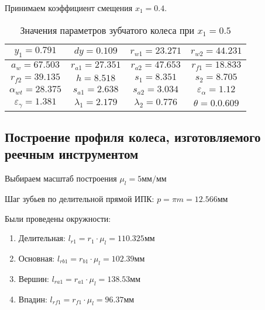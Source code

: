 Принимаем коэффициент смещения $x_1 = 0.4$.

\begin{table}[h]
	\caption{Значения параметров зубчатого колеса при $x_1 = 0.5$}
	\begin{tabular}{|c|c|c|c|}
		\hline 
		$y_1 = 0.791$ & $dy = 0.109$ &  $r_{w1} = 23.271$ & $r_{w2} = 44.231$ \\ 
		\hline 
		$a_w = 67.503$ & $r_{a1} = 27.351$ & $r_{a2} = 47.653$ & $r_{f1} = 18.833$ \\ 
		\hline 
		$r_{f2} = 39.135$ & $h = 8.518$ & $s_1 = 8.351$ & $s_2 = 8.705$ \\ 
		\hline 
		$\alpha_{wt} = 28.375$ & $s_{a1} = 2.638$ & $s_{a2} = 3.034$ & $\varepsilon_{\alpha} = 1.12$ \\ 
		\hline 
		$\varepsilon_{\gamma} = 1.381$ & $\lambda_1 = 2.179$ & $\lambda_2 = 0.776$ & $\theta = 0.0.609$ \\ 
		\hline 
	\end{tabular} 
	\label{final_table}
\end{table}

\subsection{Построение профиля колеса, изготовляемого реечным инструментом}

Выбираем масштаб построения $\mu_l = 5 мм/мм$

Шаг зубьев по делительной прямой ИПК: $p = \pi m = 12.566мм$


Были проведены окружности:

\begin{enumerate}
	\item Делительная: $l_{r1} = r_1 \cdot \mu_l = 110.325 мм$
	\item Основная: $l_{rb1} = r_{b1} \cdot \mu_l = 102.39 мм$
	\item Вершин: $l_{ra1} = r_{a1} \cdot \mu_l = 138.53 мм$
	\item Впадин: $l_{rf1} = r_{f1} \cdot \mu_l = 96.37 мм$
\end{enumerate}

